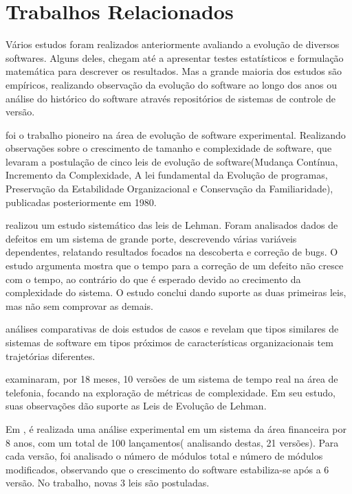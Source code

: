 \chapter{Trabalhos Relacionados}
\label{chapter:trabalhosRelacionados}

Vários estudos foram realizados anteriormente avaliando a evolução de diversos softwares. Alguns deles, chegam até a apresentar testes estatísticos e formulação matemática para descrever os resultados. Mas a grande maioria dos estudos são empíricos, realizando observação da evolução do software ao longo dos anos ou análise do histórico do software através repositórios de sistemas de controle de versão.

\cite{belady1976model} foi o trabalho pioneiro na área de evolução de software experimental. Realizando observações sobre o crescimento  de tamanho e complexidade de software, que levaram a postulação de cinco leis de evolução de software(Mudança Contínua, Incremento da Complexidade, A lei fundamental da Evolução de programas, Preservação da Estabilidade Organizacional e Conservação da Familiaridade), publicadas posteriormente em 1980.

\cite{chong1986empirical,yuen1987statistical,chong1988analyzing} realizou um estudo sistemático das leis de Lehman. Foram analisados dados de defeitos em um sistema de grande porte, descrevendo várias variáveis dependentes, relatando resultados focados na descoberta e correção de bugs. O estudo argumenta mostra que o tempo para a correção de um defeito não cresce com o tempo, ao contrário do que é esperado devido ao crecimento da complexidade do sistema. O estudo conclui dando suporte as duas primeiras leis, mas não sem comprovar as demais.

\cite{bendifallah1987understanding} análises comparativas de dois estudos de casos e revelam que tipos similares de sistemas de software em tipos próximos de características organizacionais tem trajetórias diferentes.

\cite{cook1994real} examinaram, por 18 meses, 10 versões de um sistema de tempo real na área de telefonia, focando na exploração de métricas de complexidade. Em seu estudo, suas observações dão suporte as Leis de Evolução de Lehman.

Em \cite{lehman1996laws}, é realizada uma análise experimental em um sistema da área financeira por 8 anos, com um total de 100 lançamentos( analisando destas, 21 versões). Para cada versão, foi analisado o número de módulos total e número de módulos modificados, observando que o crescimento do software estabiliza-se após a 6 versão. No trabalho, novas 3 leis são postuladas.

